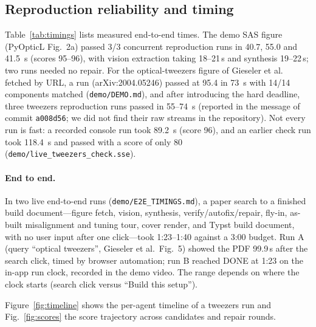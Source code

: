 \documentclass[10pt,twocolumn,letterpaper]{article}
\newcommand{\code}[1]{\texttt{\small #1}}
\begin{document}
\subsection{Reproduction reliability and timing}
Table~\ref{tab:timings} lists measured end-to-end times. The demo SAS figure (PyOpticL Fig.~2a) passed 3/3 concurrent reproduction runs in 40.7, 55.0 and \SI{41.5}{\second} (scores 95--96), with vision extraction taking 18--21\,s and synthesis 19--22\,s; two runs needed no repair. For the optical-tweezers figure of Gieseler et al.~\cite{gieseler2021} fetched by URL, a run (arXiv:2004.05246) passed at 95.4 in \SI{73}{\second} with 14/14 components matched (\code{demo/DEMO.md}), and after introducing the hard deadline, three tweezers reproduction runs passed in 55--\SI{74}{\second} (reported in the message of commit \code{a008d56}; we did not find their raw streams in the repository). Not every run is fast: a recorded console run took \SI{89.2}{\second} (score 96), and an earlier check run took \SI{118.4}{\second} and passed with a score of only 80 (\code{demo/live\_tweezers\_check.sse}). \paragraph{End to end.} In two live end-to-end runs (\code{demo/E2E\_TIMINGS.md}), a paper search to a finished build document---figure fetch, vision, synthesis, verify/autofix/repair, fly-in, as-built misalignment and tuning tour, cover render, and Typst build document, with no user input after one click---took 1:23--1:40 against a 3:00 budget. Run A (query ``optical tweezers'', Gieseler et al.\ Fig.~5) showed the PDF 99.9\,s after the search click, timed by browser automation; run B reached DONE at 1:23 on the in-app run clock, recorded in the demo video. The range depends on where the clock starts (search click versus ``Build this setup'').

Figure~\ref{fig:timeline} shows the per-agent timeline of a tweezers run and Fig.~\ref{fig:scores} the score trajectory across candidates and repair rounds.
\end{document}
